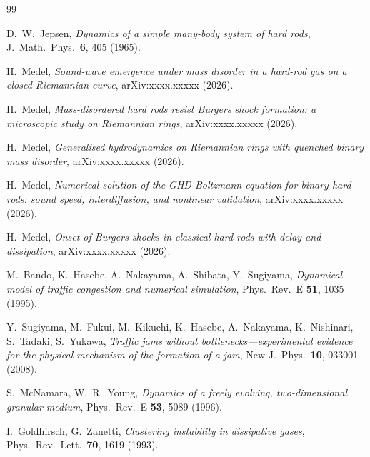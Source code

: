 \documentclass[aps,pre,twocolumn,superscriptaddress,longbibliography,floatfix]{revtex4-2}
\begin{document}
\begin{thebibliography}{99}

D.~W.~Jepsen,
\emph{Dynamics of a simple many-body system of hard rods},
J.~Math.~Phys.\ \textbf{6}, 405 (1965).

H.~Medel,
\emph{Sound-wave emergence under mass disorder in a hard-rod gas
on a closed Riemannian curve},
arXiv:xxxx.xxxxx (2026).

H.~Medel,
\emph{Mass-disordered hard rods resist Burgers shock formation:
a microscopic study on Riemannian rings},
arXiv:xxxx.xxxxx (2026).

H.~Medel,
\emph{Generalised hydrodynamics on Riemannian rings with quenched
binary mass disorder},
arXiv:xxxx.xxxxx (2026).

H.~Medel,
\emph{Numerical solution of the GHD-Boltzmann equation for binary
hard rods: sound speed, interdiffusion, and nonlinear validation},
arXiv:xxxx.xxxxx (2026).

H.~Medel,
\emph{Onset of Burgers shocks in classical hard rods with delay
and dissipation},
arXiv:xxxx.xxxxx (2026).

M.~Bando, K.~Hasebe, A.~Nakayama, A.~Shibata, Y.~Sugiyama,
\emph{Dynamical model of traffic congestion and numerical
simulation},
Phys.~Rev.~E \textbf{51}, 1035 (1995).

Y.~Sugiyama, M.~Fukui, M.~Kikuchi, K.~Hasebe, A.~Nakayama,
K.~Nishinari, S.~Tadaki, S.~Yukawa,
\emph{Traffic jams without bottlenecks---experimental evidence for
the physical mechanism of the formation of a jam},
New J.~Phys.\ \textbf{10}, 033001 (2008).

S.~McNamara, W.~R.~Young,
\emph{Dynamics of a freely evolving, two-dimensional granular
medium},
Phys.~Rev.~E \textbf{53}, 5089 (1996).

I.~Goldhirsch, G.~Zanetti,
\emph{Clustering instability in dissipative gases},
Phys.~Rev.~Lett.\ \textbf{70}, 1619 (1993).

\end{thebibliography}
\end{document}

